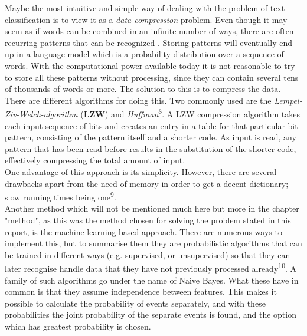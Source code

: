 \documentclass[a4paper]{article}
\begin{document}
Maybe the most intuitive and simple way of dealing with the problem of text classification is to view it as a \textit{data compression} problem. Even though it may seem as if words can be combined in an infinite number of ways, there are often recurring patterns that can be recognized \cite{AI}. Storing patterns will eventually end up in a language model \cite{ColumbiaUniversity} which is a probability distribution over a sequence of words. With the computational power available today it is not reasonable to try to store all these patterns without processing, since they can contain several tens of thousands of words or more. The solution to this is to compress the data. There are different algorithms for doing this. Two commonly used are the \textit{Lempel-Ziv-Welch-algorithm} (\textbf{LZW}) and \textit{Huffman}\textsuperscript{8}. A LZW compression algorithm takes each input sequence of bits and creates an entry in a table for that particular bit pattern, consisting of the pattern itself and a shorter code. As input is read, any pattern that has been read before results in the substitution of the shorter code, effectively compressing the total amount of input.\\One advantage of this approach is its simplicity. However, there are several drawbacks apart from the need of memory in order to get a decent dictionary; slow running times being one\textsuperscript{9}. \\

Another method which will not be mentioned much here but more in the chapter "method", as this was the method chosen for solving the problem stated in this report, is the machine learning based approach. There are numerous ways to implement this, but to summarise them they are probabilistic algorithms that can be trained in different ways (e.g. supervised, or unsupervised) so that they can later recognise handle data that they have not previously processed already\textsuperscript{10}. A family of such algorithms go under the name of Naive Bayes. What these have in common is that they assume independence between features. This makes it possible to calculate the probability of events separately, and with these probabilities the joint probability of the separate events is found, and the option which has greatest probability is chosen. %


\end{document}
